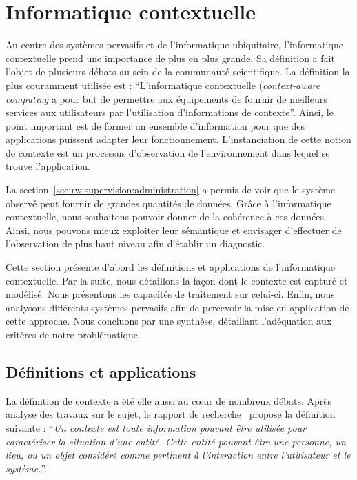 \section{Informatique contextuelle}\label{sec:rw:supervision:contexte}
Au centre des systèmes pervasifs et de l'informatique ubiquitaire, l'informatique contextuelle prend une importance de plus en plus grande. Sa définition a fait l'objet de plusieurs débats au sein de la communauté scientifique. La définition la plus couramment utilisée est : \enquote{L'informatique contextuelle (\textit{context-aware computing} a pour but de permettre aux équipements de fournir de meilleurs services aux utilisateurs par l'utilisation d'informations de contexte}\cite{Han:contextaware}. Ainsi, le point important est de former un ensemble d'information pour que des applications puissent adapter leur fonctionnement. L'instanciation de cette notion de contexte est un processus d'observation de l'environnement dans lequel se trouve l'application.

La section~\ref{sec:rw:supervision:administration} a permis de voir que le système observé peut fournir de grandes quantités de données. Grâce à l'informatique contextuelle, nous souhaitons pouvoir donner de la cohérence à ces données. Ainsi, nous pouvons mieux exploiter leur sémantique et envisager d'effectuer de l'observation de plus haut niveau afin d'établir un diagnostic.

Cette section présente d'abord les définitions et applications de l'informatique contextuelle. Par la suite, nous détaillons la façon dont le contexte est capturé et modélisé. Nous présentons les capacités de traitement sur celui-ci. Enfin, nous analysons différents systèmes pervasifs afin de percevoir la mise en application de cette approche. Nous concluons par une synthèse, détaillant l'adéquation aux critères de notre problématique.

\subsection{Définitions et applications}
La définition de contexte a été elle aussi au cœur de nombreux débats. Après analyse des travaux sur le sujet, le rapport de recherche~\cite{Dey:context} propose la définition suivante : \enquote{\it Un contexte est toute information pouvant être utilisée pour caractériser la situation d'une entité. Cette entité pouvant être une personne, un lieu, ou un objet considéré comme pertinent à l'interaction entre l'utilisateur et le système.}.

